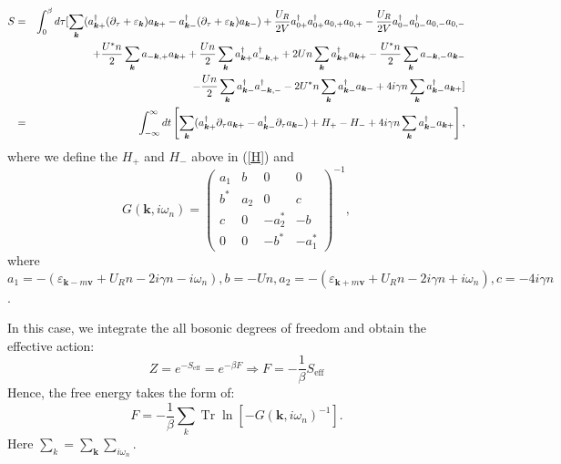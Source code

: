 \documentclass{article}
\newcommand{\nobracket}{}
\newcommand{\tmmathbf}[1]{\ensuremath{\boldsymbol{#1}}}
\newcommand{\tmop}[1]{\ensuremath{\operatorname{#1}}}
\begin{document}
\begin{eqnarray}
  S & = & \int_0^{\beta} d \tau [\nobracket \sum_{\tmmathbf{k}}
  (a^{\dagger}_{\tmmathbf{k}+} (\partial_{\tau} + \varepsilon_{\tmmathbf{k}})
  a_{\tmmathbf{k}+} - a^{\dagger}_{\tmmathbf{k}-} (\partial_{\tau} +
  \varepsilon_{\tmmathbf{k}}) a_{\tmmathbf{k}-}) + \frac{U_R}{2 V} a_{0
  +}^{\dagger} a_{0 +}^{\dagger} a_{0, +} a_{0, +} - \frac{U_R}{2 V} a_{0
  -}^{\dagger} a_{0 -}^{\dagger} a_{0, -} a_{0, -} \nonumber\\
  &  & + \frac{U^{\ast} n}{2} \sum_{\tmmathbf{k}} a_{-\tmmathbf{k}, +}
  a_{\tmmathbf{k}+} + \frac{U n}{2} \sum_{\tmmathbf{k}}
  a_{\tmmathbf{k}+}^{\dagger} a_{-\tmmathbf{k}, +}^{\dagger} + 2 U n
  \sum_{\tmmathbf{k}} a_{\tmmathbf{k}+}^{\dagger} a_{\tmmathbf{k}+} -
  \frac{U^{\ast} n}{2} \sum_{\tmmathbf{k}} a_{-\tmmathbf{k}, -}
  a_{\tmmathbf{k}-} \nonumber\\
  &  & - \frac{U n}{2} \sum_{\tmmathbf{k}} a_{\tmmathbf{k}-}^{\dagger}
  a_{-\tmmathbf{k}, -}^{\dagger} - 2 U^{\ast} n \sum_{\tmmathbf{k}}
  a_{\tmmathbf{k}-}^{\dagger} a_{\tmmathbf{k}-} + 4 i \gamma n
  \sum_{\tmmathbf{k}} a_{\tmmathbf{k}-}^{\dagger} a_{\tmmathbf{k}+}
  \large{\large{}] \nobracket} \\
  & = & \int_{- \infty}^{\infty} d t \left[ \sum_{\tmmathbf{k}}
  (a^{\dagger}_{\tmmathbf{k}+} \partial_{\tau} a_{\tmmathbf{k}+} -
  a^{\dagger}_{\tmmathbf{k}-} \partial_{\tau} a_{\tmmathbf{k}-}) + H_+ - H_- +
  4 i \gamma n \sum_{\tmmathbf{k}} a_{\tmmathbf{k}-}^{\dagger}
  a_{\tmmathbf{k}+} \right], 
\end{eqnarray}
where we define the $H_+$ and $H_-$ above in (\ref{H}) and
\begin{equation}
  G (\tmmathbf{k}, i \omega_n) = \left(\begin{array}{cccc}
    a_1 & b & 0 & 0\\
    b^{\ast} & a_2 & 0 & c\\
    c & 0 & - a_2^{\ast} & - b\\
    0 & 0 & - b^{\ast} & - a_1^{\ast}
  \end{array}\right)^{- 1}, \label{Green2}
\end{equation}
where $a_1 = - (\varepsilon_{\tmmathbf{k}- m\tmmathbf{v}} + U_R n - 2 i
\gamma n - i \omega_n), b = - U n, a_2 = - (\varepsilon_{\tmmathbf{k}+
m\tmmathbf{v}} + U_R n - 2 i \gamma n + i \omega_n), c = - 4 i \gamma n$.

In this case, we integrate the all bosonic degrees of freedom and obtain the
effective action:
\begin{equation}
  Z = e^{- S_{\tmop{eff}}} = e^{- \beta F} \Rightarrow F = - \frac{1}{\beta}
  S_{\tmop{eff}}
\end{equation}
Hence, the free energy takes the form of:
\begin{equation}
  F = - \frac{1}{\beta} \sum_k \tmop{Tr} \ln [- G (\tmmathbf{k}, i
  \omega_n)^{- 1}].
\end{equation}
Here $\sum_k = \sum_{\tmmathbf{k}} \sum_{i \omega_n}$.
\end{document}
